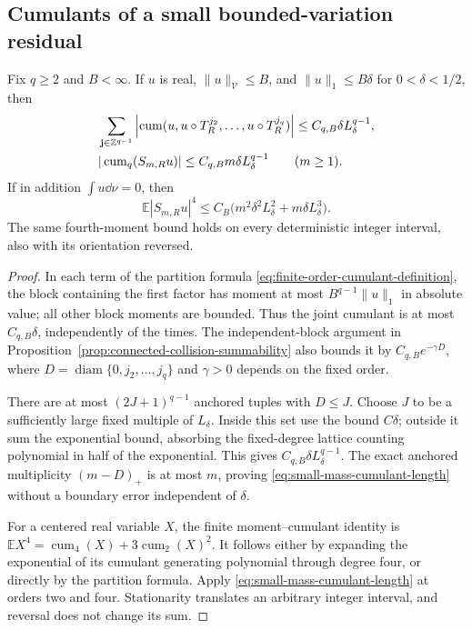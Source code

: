 \subsection{Cumulants of a small bounded-variation residual}
\begin{lemma}
\label{lem:small-mass-cumulants}
Fix $q\ge2$ and $B<\infty$. If $u$ is real,
$\|u\|_{\mathcal V}\le B$, and $\|u\|_1\le B\delta$ for
$0<\delta<1/2$, then
\begin{align}
 &\sum_{\mathbf j\in\Z^{q-1}}
 \left|\operatorname{cum}(u,u\circ T_R^{j_2},\ldots,
                                      u\circ T_R^{j_q})\right|
       \le C_{q,B}\delta L_\delta^{q-1},
       \label{eq:small-mass-connected}\\
 &|\operatorname{cum}_q(S_{m,R}u)|
       \le C_{q,B}m\delta L_\delta^{q-1}\qquad(m\ge1).
       \label{eq:small-mass-cumulant-length}
\end{align}
If in addition $\int u\dd\nu=0$, then
\begin{equation}\label{eq:small-residual-fourth}
 \mathbb E|S_{m,R}u|^4
       \le C_B\bigl(m^2\delta^2L_\delta^2
                          +m\delta L_\delta^3\bigr).
\end{equation}
The same fourth-moment bound holds on every deterministic integer
interval, also with its orientation reversed.
\end{lemma}
\begin{proof}
In each term of the partition formula
\eqref{eq:finite-order-cumulant-definition}, the block containing the
first factor has moment at most $B^{q-1}\|u\|_1$ in absolute value;
all other block moments are bounded. Thus the joint cumulant is at
most $C_{q,B}\delta$, independently of the times. The independent-block
argument in Proposition~\ref{prop:connected-collision-summability}
also bounds it by $C_{q,B}e^{-\gamma D}$, where
$D=\operatorname{diam}\{0,j_2,\ldots,j_q\}$ and $\gamma>0$
depends on the fixed order.

There are at most $(2J+1)^{q-1}$ anchored tuples with $D\le J$.
Choose $J$ to be a sufficiently large fixed multiple of $L_\delta$.
Inside this set use the bound $C\delta$; outside it sum the
exponential bound, absorbing the fixed-degree lattice counting
polynomial in half of the exponential. This gives
$C_{q,B}\delta L_\delta^{q-1}$. The exact anchored multiplicity
$(m-D)_+$ is at most $m$, proving
\eqref{eq:small-mass-cumulant-length} without a boundary error
independent of $\delta$.

For a centered real variable $X$, the finite moment--cumulant identity
is $\mathbb E X^4=\operatorname{cum}_4(X)+
3\operatorname{cum}_2(X)^2$. It follows either by expanding the
exponential of its cumulant generating polynomial through degree
four, or directly by the partition formula. Apply
\eqref{eq:small-mass-cumulant-length} at orders two and four.
Stationarity translates an arbitrary integer interval, and reversal
does not change its sum.
\end{proof}

